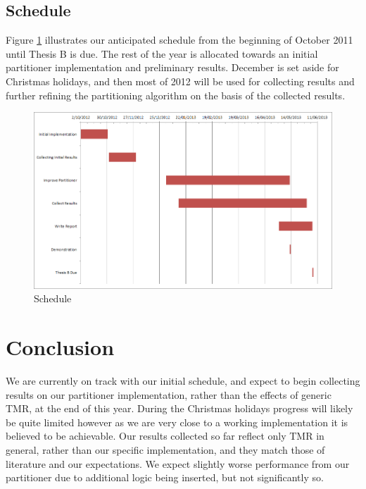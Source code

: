\documentclass[12pt,final,oneside]{dwThesis} %
\begin{document}
\section{Schedule}
Figure \ref{Schedule} illustrates our anticipated schedule from the beginning of October 2011 until Thesis B is due. The rest of the year is allocated towards an initial partitioner implementation and preliminary results. December is set aside for Christmas holidays, and then most of 2012 will be used for collecting results and further refining the partitioning algorithm on the basis of the collected results.
\begin{figure}
    \begin{center}
        \includegraphics[width=\textwidth]{images/schedule.png}
        \caption{Schedule}
        \label{Schedule}
    \end{center}
\end{figure}

\chapter{Conclusion}
We are currently on track with our initial schedule, and expect to begin collecting results on our partitioner implementation, rather than the effects of generic \ac{TMR}, at the end of this year. During the Christmas holidays progress will likely be quite limited however as we are very close to a working implementation it is believed to be achievable.
Our results collected so far reflect only \ac{TMR} in general, rather than our specific implementation, and they match those of literature and our expectations. We expect slightly worse performance from our partitioner due to additional logic being inserted, but not significantly so.

\appendix
\end{document}
